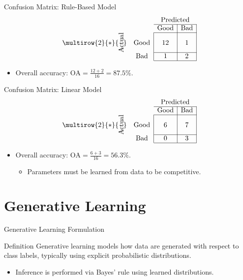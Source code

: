 \documentclass[10pt]{beamer}
\begin{document}
\begin{frame}{Confusion Matrix: Rule-Based Model}
    \justifying
    \[
    \begin{array}{cc|c|c|}
        & \multicolumn{1}{c}{} & \multicolumn{2}{c}{\text{Predicted}} \\ \cline{3-4}
        & \multicolumn{1}{c}{} & \text{Good} & \text{Bad} \\ \cline{3-4}
        \multirow{2}{*}{\rotatebox[origin=c]{90}{\text{Actual}}} & \text{Good} & 12 & 1 \\ \cline{3-4}
        & \text{Bad} & 1 & 2 \\ \cline{3-4}
    \end{array}
    \]
    \begin{itemize}
        \item Overall accuracy: $\text{OA} = \frac{12+2}{16} = 87.5\%$.
    \end{itemize}
\end{frame}

\begin{frame}{Confusion Matrix: Linear Model}
    \justifying
    \[
    \begin{array}{cc|c|c|}
        & \multicolumn{1}{c}{} & \multicolumn{2}{c}{\text{Predicted}} \\ \cline{3-4}
        & \multicolumn{1}{c}{} & \text{Good} & \text{Bad} \\ \cline{3-4}
        \multirow{2}{*}{\rotatebox[origin=c]{90}{\text{Actual}}} & \text{Good} & 6 & 7 \\ \cline{3-4}
        & \text{Bad} & 0 & 3 \\ \cline{3-4}
    \end{array}
    \]
    \begin{itemize}
        \item Overall accuracy: $\text{OA} = \frac{6+3}{16} = 56.3\%$.
        \begin{itemize}
            \item Parameters must be learned from data to be competitive.
        \end{itemize}
    \end{itemize}
\end{frame}

\section{Generative Learning}

\begin{frame}{Generative Learning Formulation}
    \justifying
    \begin{conceptbox}{Definition}
        Generative learning models how data are generated with respect to class labels,
        typically using explicit probabilistic distributions.
    \end{conceptbox}
    \begin{itemize}
        \item Inference is performed via Bayes' rule using learned distributions.
    \end{itemize}
\end{frame}
\end{document}
